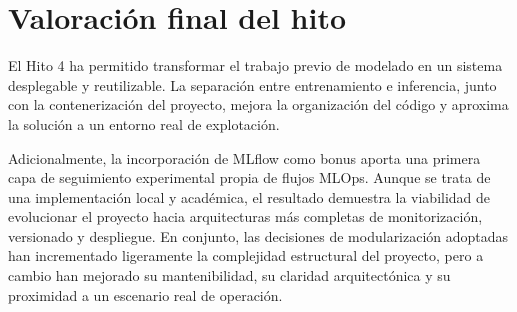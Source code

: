 \section{Valoraci\'on final del hito}

El Hito 4 ha permitido transformar el trabajo previo de modelado en un sistema desplegable y reutilizable. La separaci\'on entre entrenamiento
e inferencia, junto con la contenerizaci\'on del proyecto, mejora la organizaci\'on del c\'odigo y aproxima la soluci\'on a un entorno real de
explotaci\'on.

Adicionalmente, la incorporaci\'on de MLflow como bonus aporta una primera capa de seguimiento experimental propia de flujos MLOps. Aunque se
trata de una implementaci\'on local y acad\'emica, el resultado demuestra la viabilidad de evolucionar el proyecto hacia arquitecturas m\'as
completas de monitorizaci\'on, versionado y despliegue. En conjunto, las decisiones de modularizaci\'on adoptadas han incrementado ligeramente
la complejidad estructural del proyecto, pero a cambio han mejorado su mantenibilidad, su claridad arquitect\'onica y su proximidad a un
escenario real de operaci\'on.